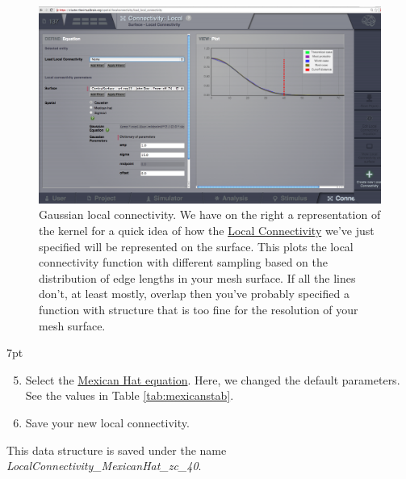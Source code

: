 \documentclass{tufte-handout}
\newenvironment{formal}{%
  \def\FrameCommand{%
    \hspace{1pt}%
    {\color{DarkBlue}\vrule width 2pt}%
    {\color{formalshade}\vrule width 4pt}%
    \colorbox{formalshade}%
  }%
  \MakeFramed{\advance\hsize-\width\FrameRestore}%
  \noindent\hspace{-4.55pt}%
  \begin{adjustwidth}{}{7pt}%
  \vspace{2pt}\vspace{2pt}%
}
{%
  \vspace{2pt}\end{adjustwidth}\endMakeFramed%
}
\begin{document}
\begin{figure}[h]
  \includegraphics[width=\linewidth]{Handout_UI_BuildingYourOwnBrainNetworkModel_YourOwnLocalConnectivity}%
  \caption{Gaussian local connectivity. We have on the right a representation of the kernel for a quick idea of how
the \underline{Local Connectivity} we've just specified will be represented on the
surface. This plots the local connectivity function with different sampling
based on the distribution of edge lengths in your mesh surface. If all the
lines don't, at least mostly, overlap then you've probably specified a
function with structure that is too fine for the resolution of your mesh
surface. }%
  \label{fig:lc_gaussian}%
\end{figure}




\begin{formal}
\begin{enumerate}[resume]
\setcounter{enumi}{4}
\item Select the \underline{Mexican Hat equation}. Here, we changed the default parameters. See the values in Table \ref{tab:mexicanstab}.
\item Save your new local connectivity.
\end{enumerate}
\end{formal}

This data structure is saved under the name \\
\textit{LocalConnectivity\_MexicanHat\_zc\_40}.
\end{document}
